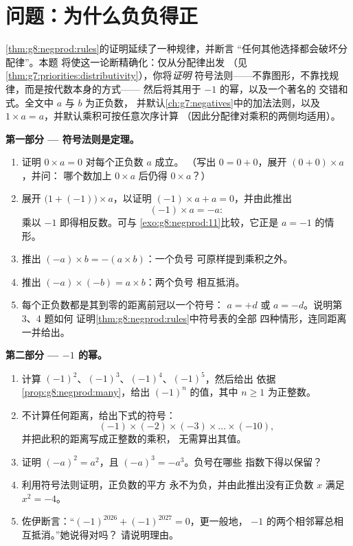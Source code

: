 \section{问题：为什么负负得正}

\begin{problem}
\label{pb:g8:negprod:1}
\cref{thm:g8:negprod:rules}的证明延续了一种规律，并断言
“任何其他选择都会破坏分配律”。本题
将使这一论断精确化：仅从分配律出发
（见\cref{thm:g7:priorities:distributivity}），你将\emph{证明}
符号法则——不靠图形，不靠找规律，而是按代数本身的方式——
然后将其用于 $-1$ 的幂，以及一个著名的
交错和式。全文中 $a$ 与 $b$ 为正负数，
并默认\cref{ch:g7:negatives}中的加法法则，以及
$1 \times a = a$，并默认乘积可按任意次序计算
（因此分配律对乘积的两侧均适用）。

\medskip
\noindent\textbf{第一部分 --- 符号法则是定理。}
\begin{enumerate}
  \item 证明 $0 \times a = 0$ 对每个正负数 $a$ 成立。
        （写出 $0 = 0 + 0$，展开 $(0 + 0) \times a$，并问：
        哪个数加上 $0 \times a$ 后仍得 $0 \times a$？）
  \item 展开 $\bigl(1 + (-1)\bigr) \times a$，以证明
        $(-1) \times a + a = 0$，并由此推出
        \[
        (-1) \times a = -a :
        \]
        乘以 $-1$ 即得相反数。可与
        \cref{exo:g8:negprod:11}比较，它正是 $a = -1$ 的情形。
  \item 推出 $(-a) \times b = -(a \times b)$：一个负号
        可原样提到乘积之外。
  \item 推出 $(-a) \times (-b) = a \times b$：两个负号
        相互抵消。
  \item 每个正负数都是其到零的距离前冠以一个符号：
        $a = +d$ 或 $a = -d$。说明第 3、4 题如何
        证明\cref{thm:g8:negprod:rules}中符号表的全部
        四种情形，连同距离一并给出。
\end{enumerate}

\medskip
\noindent\textbf{第二部分 --- $-1$ 的幂。}
\begin{enumerate}[resume]
  \item 计算 $(-1)^2$、$(-1)^3$、$(-1)^4$、$(-1)^5$，然后给出
        依据\cref{prop:g8:negprod:many}，给出
        $(-1)^n$ 的值，其中 $n \geq 1$ 为正整数。
  \item 不计算任何距离，给出下式的符号：
        \[
        (-1) \times (-2) \times (-3) \times \dots \times (-10),
        \]
        并把此积的距离写成正整数的乘积，
        无需算出其值。
  \item 证明 $(-a)^2 = a^2$，且 $(-a)^3 = -a^3$。负号在哪些
        指数下得以保留？
  \item 利用符号法则证明，正负数的平方
        永不为负，并由此推出没有正负数
        $x$ 满足 $x^2 = -4$。
  \item 佐伊断言：“$(-1)^{2026} + (-1)^{2027} = 0$，更一般地，
        $-1$ 的两个相邻幂总相互抵消。”她说得对吗？
        请说明理由。
\end{enumerate}


\end{problem}
